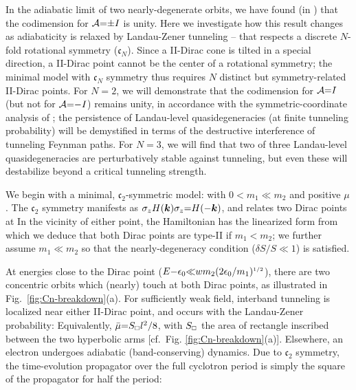 \documentclass[aps, showpacs, twocolumn, notitlepage, superscriptaddress]{revtex4-1}
\begin{document}
In the adiabatic limit of two nearly-degenerate orbits, we have found (in ) that the codimension for ${\cal A}{=}{\pm} I$ is unity. Here we investigate how this result changes as adiabaticity is relaxed by Landau-Zener tunneling -- that respects a discrete $N$-fold rotational symmetry ($\mathfrak{c}_N$). Since a II-Dirac cone is tilted in a special direction, a II-Dirac point cannot be the center of a rotational symmetry; the minimal model with $\mathfrak{c}_N$ symmetry thus requires $N$ distinct but symmetry-related II-Dirac points. For $N{=}2$, we will demonstrate that the codimension for ${\cal A}{=}I$ (but not for ${\cal A}{=}{-}I$) remains unity, in accordance with the symmetric-coordinate analysis of ; the persistence of  Landau-level quasidegeneracies  (at finite tunneling probability) will be demystified in terms of the destructive interference of tunneling Feynman paths. For $N{=}3$, we will find that two of three Landau-level quasidegeneracies are perturbatively stable against tunneling, but even these will destabilize beyond a critical tunneling strength.

We begin with a minimal, $\mathfrak{c}_2$-symmetric model:
with $0{<}m_1{\ll}m_2$ and positive $\mu$.  The $\mathfrak{c}_2$ symmetry manifests as $\sigma_z H(\boldsymbol{k})\sigma_z{=}H({-}\boldsymbol{k})$, and relates 
two Dirac points at
In the vicinity of either point, the  Hamiltonian has the linearized form 
from which we deduce that both Dirac points are  type-II if $m_1{<}m_2$; we further assume $m_1{\ll}m_2$ so that the nearly-degeneracy condition ($\delta S/S{\ll}1$) is satisfied. 

At energies close to the Dirac point ($E{-}\epsilon_0 {\ll} wm_2(2\epsilon_0/m_1)^{\scriptscriptstyle{1/2}}$), there are two concentric orbits which (nearly) touch at both Dirac points, as illustrated in Fig.\ \ref{fig:Cn-breakdown}(a). For sufficiently weak field, interband tunneling is localized near either II-Dirac point, and occurs with the Landau-Zener probability:
Equivalently, $\bar{\mu}{=}S_{\scriptscriptstyle{\square}}l^2/8$, with $S_{\scriptscriptstyle{\square}}$ the area of rectangle inscribed between the two hyperbolic arms [cf.\  Fig. \ref{fig:Cn-breakdown}(a)]. Elsewhere, an electron undergoes adiabatic (band-conserving) dynamics. Due to $\mathfrak{c}_2$ symmetry, the time-evolution propagator over the full cyclotron period is simply the square of the propagator for half the period: 
\end{document}

